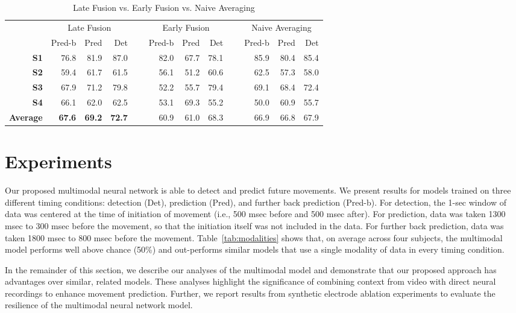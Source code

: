 \documentclass[letterpaper]{article} %
\begin{document}
\begin{table*}[h]
\centering
\caption{Late Fusion vs. Early Fusion vs. Naive Averaging
\label{tab:earlyvlate}
}
\begin{tabular}{@{}rrrrrrrrrrrr@{}}
\toprule
& \multicolumn{3}{c}{Late Fusion} &~& \multicolumn{3}{c}{Early Fusion} &~& \multicolumn{3}{c}{Naive Averaging} \\
& Pred-b & Pred & Det && Pred-b & Pred & Det && Pred-b & Pred & Det \\
\cmidrule{2-4} \cmidrule{6-8} \cmidrule{10-12} 
\textbf{S1}        & 76.8  & 81.9 & 87.0 && 82.0 & 67.7 & 78.1 && 85.9 & 80.4 & 85.4\\ 
\textbf{S2}        & 59.4  & 61.7 & 61.5 && 56.1 & 51.2 & 60.6 && 62.5 & 57.3 & 58.0  \\ 
\textbf{S3}        & 67.9  & 71.2 & 79.8 && 52.2 & 55.7 & 79.4 && 69.1 & 68.4 & 72.4\\  
\textbf{S4}        & 66.1  & 62.0 & 62.5 && 53.1 & 69.3 & 55.2 && 50.0 & 60.9 & 55.7\\ 
\cmidrule{2-4} \cmidrule{6-8} \cmidrule{10-12} 

\textbf{Average}   & \textbf{67.6}  & \textbf{69.2} & \textbf{72.7} && 60.9 & 61.0 & 68.3 && 66.9 & 66.8 & 67.9 \\
\bottomrule
\end{tabular}
\end{table*}

\section{Experiments}

Our proposed multimodal neural network is able to detect and predict future movements.
We present results for models trained on three different timing conditions: detection (Det), prediction (Pred), and further back prediction (Pred-b).
For detection, the 1-sec window of data was centered at the time of initiation of movement (i.e., 500 msec before and 500 msec after).
For prediction, data was taken 1300 msec to 300 msec before the movement, so that the initiation itself was not included in the data.
For further back prediction, data was taken 1800 msec to 800 msec before the movement.
Table~\ref{tab:modalities} shows that, on average across four subjects, the multimodal model performs well above chance (50\%) and out-performs similar models that use a single modality of data in every timing condition.

In the remainder of this section, we describe our analyses of the multimodal model and demonstrate that our proposed approach has advantages over similar, related models.
These analyses highlight the significance of combining context from video with direct neural recordings to enhance movement prediction.
Further, we report results from synthetic electrode ablation experiments to evaluate the resilience of the multimodal neural network model.
\end{document}
